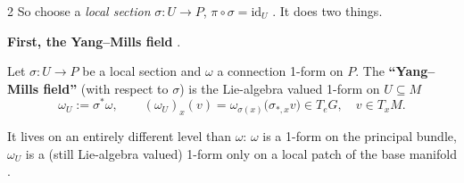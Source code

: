 \begin{paracol}{2}
So choose a \emph{local section} $\sigma\colon U\to P$, $\pi\circ\sigma=\mathrm{id}_U$  . It does two things.

\textbf{First, the Yang--Mills field} .
\begin{definition}\label{def:ym-field}
Let $\sigma\colon U\to P$ be a local section and $\omega$ a connection 1-form on $P$. The \textbf{``Yang--Mills field''} (with respect to $\sigma$) is the Lie-algebra valued 1-form on $U\subseteq M$
\[
  \omega_U:=\sigma^*\omega ,\qquad(\omega_U)_x(v)=\omega_{\sigma(x)}\bigl(\sigma_{*,x}v\bigr)\in T_eG ,\quad v\in T_xM .
\]
  
\end{definition}
It lives on an entirely different level than $\omega$: $\omega$ is a 1-form on the principal bundle, $\omega_U$ is a (still Lie-algebra valued) 1-form only on a local patch of the base manifold   .


\end{paracol}

